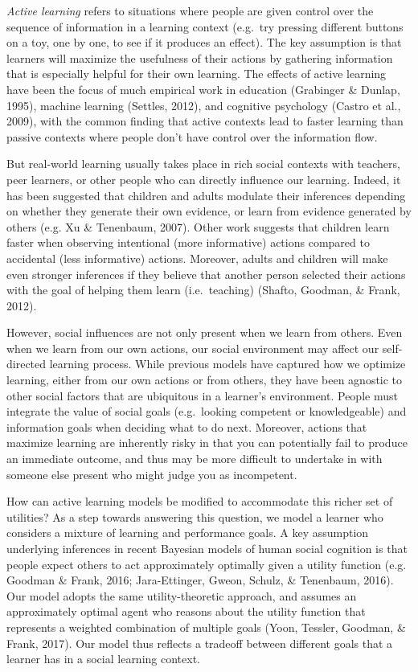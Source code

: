 \documentclass[10pt, letterpaper]{article}
\begin{document}
\emph{Active learning} refers to situations where people are given
control over the sequence of information in a learning context (e.g.~try
pressing different buttons on a toy, one by one, to see if it produces
an effect). The key assumption is that learners will maximize the
usefulness of their actions by gathering information that is especially
helpful for their own learning. The effects of active learning have been
the focus of much empirical work in education (Grabinger \& Dunlap,
1995), machine learning (Settles, 2012), and cognitive psychology
(Castro et al., 2009), with the common finding that active contexts lead
to faster learning than passive contexts where people don't have control
over the information flow.

But real-world learning usually takes place in rich social contexts with
teachers, peer learners, or other people who can directly influence our
learning. Indeed, it has been suggested that children and adults
modulate their inferences depending on whether they generate their own
evidence, or learn from evidence generated by others (e.g. Xu \&
Tenenbaum, 2007). Other work suggests that children learn faster when
observing intentional (more informative) actions compared to accidental
(less informative) actions. Moreover, adults and children will make even
stronger inferences if they believe that another person selected their
actions with the goal of helping them learn (i.e.~teaching) (Shafto,
Goodman, \& Frank, 2012).

However, social influences are not only present when we learn from
others. Even when we learn from our own actions, our social environment
may affect our self-directed learning process. While previous models
have captured how we optimize learning, either from our own actions or
from others, they have been agnostic to other social factors that are
ubiquitous in a learner's environment. People must integrate the value
of social goals (e.g.~looking competent or knowledgeable) and
information goals when deciding what to do next. Moreover, actions that
maximize learning are inherently risky in that you can potentially fail
to produce an immediate outcome, and thus may be more difficult to
undertake in with someone else present who might judge you as
incompetent.

How can active learning models be modified to accommodate this richer
set of utilities? As a step towards answering this question, we model a
learner who considers a mixture of learning and performance goals. A key
assumption underlying inferences in recent Bayesian models of human
social cognition is that people expect others to act approximately
optimally given a utility function (e.g. Goodman \& Frank, 2016;
Jara-Ettinger, Gweon, Schulz, \& Tenenbaum, 2016). Our model adopts the
same utility-theoretic approach, and assumes an approximately optimal
agent who reasons about the utility function that represents a weighted
combination of multiple goals (Yoon, Tessler, Goodman, \& Frank, 2017).
Our model thus reflects a tradeoff between different goals that a
learner has in a social learning context.
\end{document}
